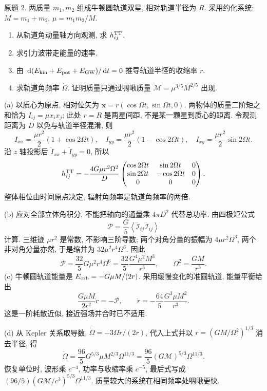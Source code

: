 \begin{exercise}\label{ps:8.2}
原题 2. 两质量 $m_1,m_2$ 组成牛顿圆轨道双星, 相对轨道半径为 $R$. 采用约化系统: $M=m_1+m_2$, $\mu=m_1m_2/M$.
\begin{enumerate}[label=(\alph*)]
\item 从轨道角动量轴方向观测, 求 $h^{\rm TT}_{ij}$.
\item 求引力波带走能量的速率.
\item 由 $\,\mathrm d(E_{\rm kin}+E_{\rm pot}+E_{\rm GW})/\,\mathrm d t=0$ 推导轨道半径的收缩率 $\dot r$.
\item 求轨道角频率 $\dot\Omega$. 证明质量只通过啁啾质量 $\mathcal M=\mu^{3/5}M^{2/5}$ 出现.
\end{enumerate}
\end{exercise}
\begin{solution}
(a) 以质心为原点, 相对位矢为 $\boldsymbol x=r(\cos\Omega t,\sin\Omega t,0)$. 两物体的质量二阶矩之和恰为 $I_{ij}=\mu x_ix_j$; 此处 $r=R$ 是两星间距, 不是某一颗星到质心的距离. 令观测距离为 $D$ 以免与轨道半径混淆, 则
\[
I_{xx}=\frac{\mu r^2}{2}(1+\cos2\Omega t),\quad
I_{yy}=\frac{\mu r^2}{2}(1-\cos2\Omega t),\quad
I_{xy}=\frac{\mu r^2}{2}\sin2\Omega t.
\]
沿 $z$ 轴投影后 $\ddot I_{xx}+\ddot I_{yy}=0$, 所以
\[
h^{\rm TT}_{ij}=-\frac{4G\mu r^2\Omega^2}{D}
\begin{pmatrix}\cos2\Omega t&\sin2\Omega t&0\\
\sin2\Omega t&-\cos2\Omega t&0\\0&0&0\end{pmatrix}.
\]
整体相位由时间原点决定, 辐射角频率是轨道角频率的两倍.

(b) 应对全部立体角积分, 不能把轴向的通量乘 $4\pi D^2$ 代替总功率. 由四极矩公式
\[
\mathcal P=\frac G5\left\langle\dddot{\mathcal I}_{ij}\dddot{\mathcal I}_{ij}\right\rangle
\]
计算. 三维迹 $\mu r^2$ 是常数, 不影响三阶导数; 两个对角分量的振幅为 $4\mu r^2\Omega^3$, 两个非对角分量亦然, 于是缩并为 $32\mu^2r^4\Omega^6$. 因此
\[
\mathcal P=\frac{32}{5}G\mu^2r^4\Omega^6
=\frac{32}{5}\frac{G^4\mu^2M^3}{r^5},\qquad \Omega^2=\frac{GM}{r^3}.
\]
(c) 牛顿圆轨道能量是 $E_{\rm orb}=-G\mu M/(2r)$. 采用缓慢变化的准圆轨道, 能量平衡给出
\[
\frac{G\mu M}{2r^2}\dot r=-\mathcal P,
\qquad \dot r=-\frac{64}{5}\frac{G^3\mu M^2}{r^3}.
\]
这是一阶耗散近似, 接近强场并合时已不适用.

(d) 从 Kepler 关系取导数, $\dot\Omega=-3\Omega\dot r/(2r)$, 代入上式并以 $r=(GM/\Omega^2)^{1/3}$ 消去半径, 得
\[
\dot\Omega=\frac{96}{5}G^{5/3}\mu M^{2/3}\Omega^{11/3}
=\frac{96}{5}(G\mathcal M)^{5/3}\Omega^{11/3}.
\]
恢复单位时, 波形乘 $c^{-4}$, 功率与收缩率乘 $c^{-5}$, 最后式写成 $(96/5)(G\mathcal M/c^3)^{5/3}\Omega^{11/3}$. 质量较大的系统在相同频率处啁啾更快.
\end{solution}

